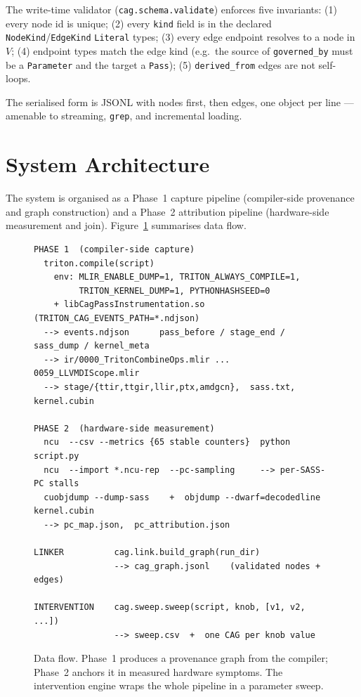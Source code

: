 \documentclass[10pt]{article}
\begin{document}
The write-time validator (\texttt{cag.schema.validate}) enforces five invariants: (1) every node id is unique; (2) every \texttt{kind} field is in the declared \texttt{NodeKind}/\texttt{EdgeKind} \texttt{Literal} types; (3) every edge endpoint resolves to a node in $V$; (4) endpoint types match the edge kind (e.g.~the source of \texttt{governed\_by} must be a \texttt{Parameter} and the target a \texttt{Pass}); (5) \texttt{derived\_from} edges are not self-loops.

The serialised form is JSONL with nodes first, then edges, one object per line --- amenable to streaming, \texttt{grep}, and incremental loading.

\section{System Architecture}

The system is organised as a Phase~1 capture pipeline (compiler-side provenance and graph construction) and a Phase~2 attribution pipeline (hardware-side measurement and join). Figure~\ref{fig:arch} summarises data flow.

\begin{figure}[t]
\centering
\begin{lstlisting}[basicstyle=\ttfamily\scriptsize,frame=single,framerule=0.4pt,rulecolor=\color{black!40},backgroundcolor=\color{codegray},xleftmargin=0.4em,xrightmargin=0.4em,aboveskip=0.4em,belowskip=0.2em]
PHASE 1  (compiler-side capture)
  triton.compile(script)
    env: MLIR_ENABLE_DUMP=1, TRITON_ALWAYS_COMPILE=1,
         TRITON_KERNEL_DUMP=1, PYTHONHASHSEED=0
    + libCagPassInstrumentation.so  (TRITON_CAG_EVENTS_PATH=*.ndjson)
  --> events.ndjson      pass_before / stage_end / sass_dump / kernel_meta
  --> ir/0000_TritonCombineOps.mlir ... 0059_LLVMDIScope.mlir
  --> stage/{ttir,ttgir,llir,ptx,amdgcn},  sass.txt,  kernel.cubin

PHASE 2  (hardware-side measurement)
  ncu  --csv --metrics {65 stable counters}  python script.py
  ncu  --import *.ncu-rep  --pc-sampling     --> per-SASS-PC stalls
  cuobjdump --dump-sass    +  objdump --dwarf=decodedline  kernel.cubin
  --> pc_map.json,  pc_attribution.json

LINKER          cag.link.build_graph(run_dir)
                --> cag_graph.jsonl    (validated nodes + edges)

INTERVENTION    cag.sweep.sweep(script, knob, [v1, v2, ...])
                --> sweep.csv  +  one CAG per knob value
\end{lstlisting}
\caption{Data flow. Phase~1 produces a provenance graph from the compiler; Phase~2 anchors it in measured hardware symptoms. The intervention engine wraps the whole pipeline in a parameter sweep.}
\label{fig:arch}
\end{figure}
\end{document}
